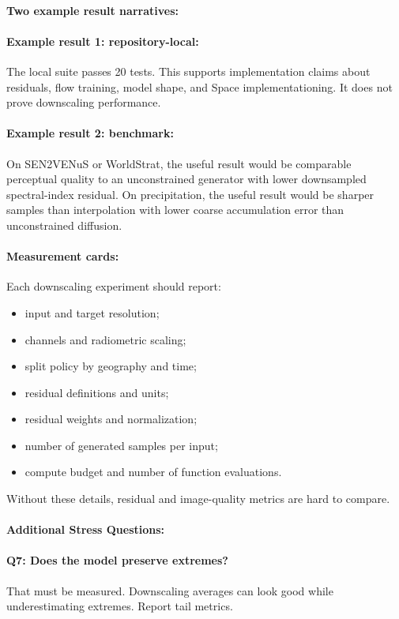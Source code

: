 \documentclass{article}
\begin{document}
\paragraph{Two example result narratives:}

\paragraph{Example result 1: repository-local:}
The local suite passes 20 tests. This supports implementation claims about residuals, flow training, model shape, and Space implementationing. It does not prove downscaling performance.

\paragraph{Example result 2: benchmark:}
On SEN2VENuS or WorldStrat, the useful result would be comparable perceptual quality to an unconstrained generator with lower downsampled spectral-index residual. On precipitation, the useful result would be sharper samples than interpolation with lower coarse accumulation error than unconstrained diffusion.

\paragraph{Measurement cards:}

Each downscaling experiment should report:
\begin{itemize}
  \item input and target resolution;
  \item channels and radiometric scaling;
  \item split policy by geography and time;
  \item residual definitions and units;
  \item residual weights and normalization;
  \item number of generated samples per input;
  \item compute budget and number of function evaluations.
\end{itemize}
Without these details, residual and image-quality metrics are hard to compare.

\paragraph{Additional Stress Questions:}

\paragraph{Q7: Does the model preserve extremes?}
That must be measured. Downscaling averages can look good while underestimating extremes. Report tail metrics.
\end{document}
